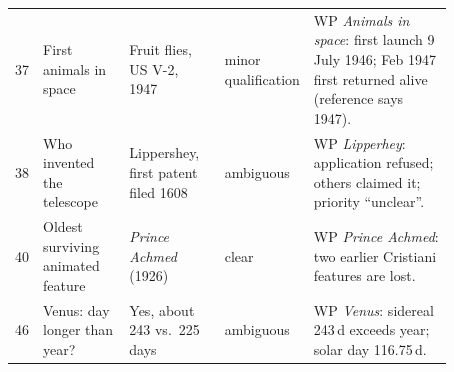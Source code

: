 \documentclass[11pt]{article}
\begin{document}
\begin{center}
\begin{tabular}{@{}r >{\raggedright\arraybackslash}p{0.2\linewidth} >{\raggedright\arraybackslash}p{0.22\linewidth} >{\raggedright\arraybackslash}p{0.12\linewidth} >{\raggedright\arraybackslash}p{0.33\linewidth}@{}}
37 & First animals in space & Fruit flies, US V-2, 1947 & minor qualification & WP \emph{Animals in space}: first launch 9 July 1946; Feb 1947 first returned alive (reference says 1947). \\
38 & Who invented the telescope & Lippershey, first patent filed 1608 & ambiguous & WP \emph{Lipperhey}: application refused; others claimed it; priority ``unclear''. \\
40 & Oldest surviving animated feature & \emph{Prince Achmed} (1926) & clear & WP \emph{Prince Achmed}: two earlier Cristiani features are lost. \\
46 & Venus: day longer than year? & Yes, about 243 vs.\ 225 days & ambiguous & WP \emph{Venus}: sidereal 243\,d exceeds year; solar day 116.75\,d. \\
\bottomrule
\end{tabular}
\end{center}
\end{document}
